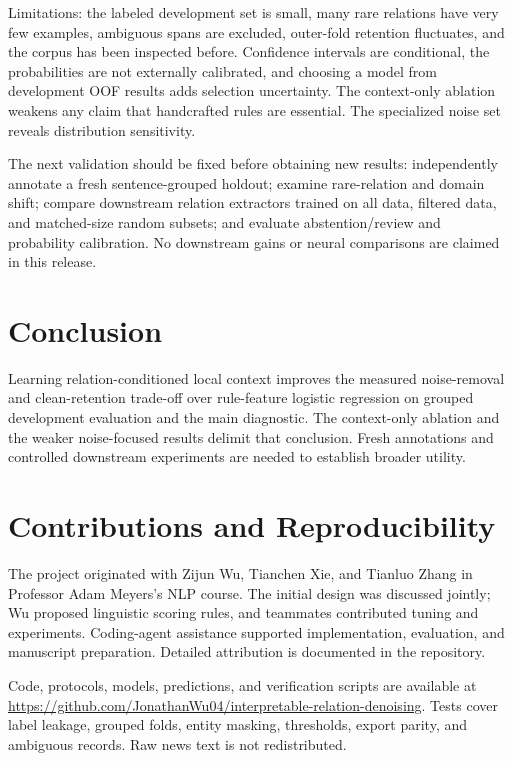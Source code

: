 \documentclass[11pt]{article}
\begin{document}
Limitations: the labeled development set is small, many rare relations have very few examples, ambiguous spans are excluded, outer-fold retention fluctuates, and the corpus has been inspected before. Confidence intervals are conditional, the probabilities are not externally calibrated, and choosing a model from development OOF results adds selection uncertainty. The context-only ablation weakens any claim that handcrafted rules are essential. The specialized noise set reveals distribution sensitivity.

The next validation should be fixed before obtaining new results: independently annotate a fresh sentence-grouped holdout; examine rare-relation and domain shift; compare downstream relation extractors trained on all data, filtered data, and matched-size random subsets; and evaluate abstention/review and probability calibration. No downstream gains or neural comparisons are claimed in this release.

\section{Conclusion}
Learning relation-conditioned local context improves the measured noise-removal and clean-retention trade-off over rule-feature logistic regression on grouped development evaluation and the main diagnostic. The context-only ablation and the weaker noise-focused results delimit that conclusion. Fresh annotations and controlled downstream experiments are needed to establish broader utility.
\section*{Contributions and Reproducibility}
The project originated with Zijun Wu, Tianchen Xie, and Tianluo Zhang in Professor Adam Meyers's NLP course. The initial design was discussed jointly; Wu proposed linguistic scoring rules, and teammates contributed tuning and experiments. Coding-agent assistance supported implementation, evaluation, and manuscript preparation. Detailed attribution is documented in the repository.

Code, protocols, models, predictions, and verification scripts are available at \url{https://github.com/JonathanWu04/interpretable-relation-denoising}. Tests cover label leakage, grouped folds, entity masking, thresholds, export parity, and ambiguous records. Raw news text is not redistributed.


\end{document}
